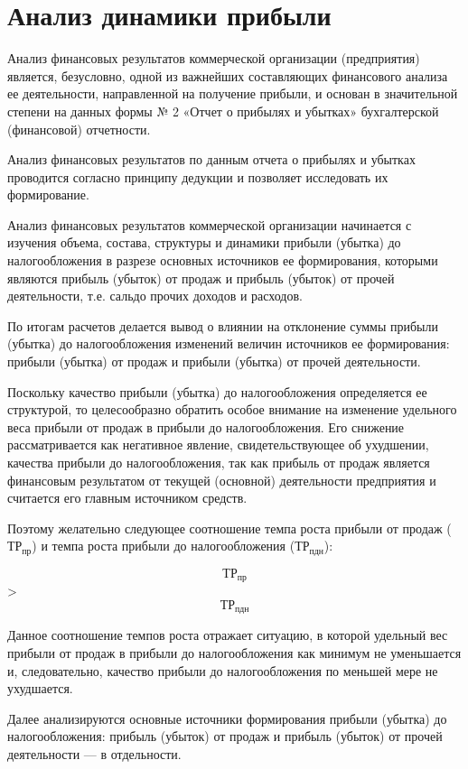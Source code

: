 \section{Анализ динамики прибыли}

Анализ финансовых результатов коммерческой организации (предприятия) является, безусловно, одной из важнейших составляющих финансового анализа ее деятельности, направленной на получение прибыли, и основан в значительной степени на данных формы № 2 «Отчет о прибылях и убытках» бухгалтерской (финансовой) отчетности.

Анализ финансовых результатов по данным отчета о прибылях и убытках проводится согласно принципу дедукции и позволяет исследовать их формирование.

Анализ финансовых результатов коммерческой организации начинается с изучения объема, состава, структуры и динамики прибыли (убытка) до налогообложения в разрезе основных источников ее формирования, которыми являются прибыль (убыток) от продаж и прибыль (убыток) от прочей деятельности, т.е. сальдо прочих доходов и расходов.

По итогам расчетов делается вывод о влиянии на отклонение суммы прибыли (убытка) до налогообложения изменений величин источников ее формирования: прибыли (убытка) от продаж и прибыли (убытка) от прочей деятельности.

Поскольку качество прибыли (убытка) до налогообложения определяется ее структурой, то целесообразно обратить особое внимание на изменение удельного веса прибыли от продаж в прибыли до налогообложения. Его снижение рассматривается как негативное явление, свидетельствующее об ухудшении, качества прибыли до налогообложения, так как прибыль от продаж является финансовым результатом от текущей (основной) деятельности предприятия и считается его главным источником средств.

Поэтому желательно следующее соотношение темпа роста прибыли от продаж ($\text{ТР}_{\text{пр}}$) и темпа роста прибыли до налогообложения ($\text{ТР}_{\text{пдн}}$):

$$\text{ТР}_{\text{пр}}$$ > $$\text{ТР}_{\text{пдн}}$$

Данное соотношение темпов роста отражает ситуацию, в которой удельный вес прибыли от продаж в прибыли до налогообложения как минимум не уменьшается и, следовательно, качество прибыли до налогообложения по меньшей мере не ухудшается.

Далее анализируются основные источники формирования прибыли (убытка) до налогообложения: прибыль (убыток) от продаж и прибыль (убыток) от прочей деятельности — в отдельности.


